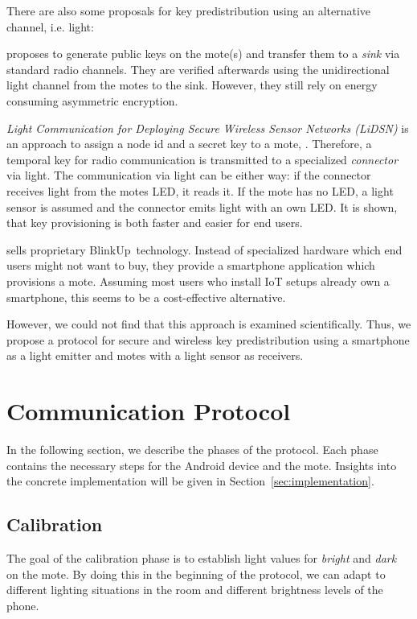 \documentclass{sig-alternate} %
\begin{document}
There are also some proposals for key predistribution using an alternative channel, i.e. light:

\cite{saxena2009blink} proposes to generate public keys on the mote(s) and transfer them to a \textit{sink} via standard radio channels.
They are verified afterwards using the unidirectional light channel from the motes to the sink.
However, they still rely on energy consuming asymmetric encryption.

\textit{Light Communication for Deploying Secure Wireless Sensor Networks (LiDSN)} is an approach to assign a node id and a secret key to a mote, \cite{doan2012lidsn}.
Therefore, a temporal key for radio communication is transmitted to a specialized \textit{connector} via light.
The communication via light can be either way: if the connector receives light from the motes LED, it reads it. If the mote has no LED, a light sensor is assumed and the connector emits light with an own LED.
It is shown, that key provisioning is both faster and easier for end users.

\cite{electricimp} sells proprietary BlinkUp~\texttrademark  technology.
Instead of specialized hardware which end users might not want to buy, they provide a smartphone application which provisions a mote.
Assuming most users who install IoT setups already own a smartphone, this seems to be a cost-effective alternative.

However, we could not find that this approach is examined scientifically.
Thus, we propose a protocol for secure and wireless key predistribution using a smartphone as a light emitter and motes with a light sensor as receivers.

\section{Communication Protocol}
\label{sec:communication_protocol}

In the following section, we describe the phases of the protocol.
Each phase contains the necessary steps for the Android device and the mote.
Insights into the concrete implementation will be given in Section~\ref{sec:implementation}.

\subsection{Calibration}
\label{sub:calibration}

The goal of the calibration phase is to establish light values for \textit{bright} and \textit{dark} on the mote.
By doing this in the beginning of the protocol, we can adapt to different lighting situations in the room and different brightness levels of the phone.
\end{document}
